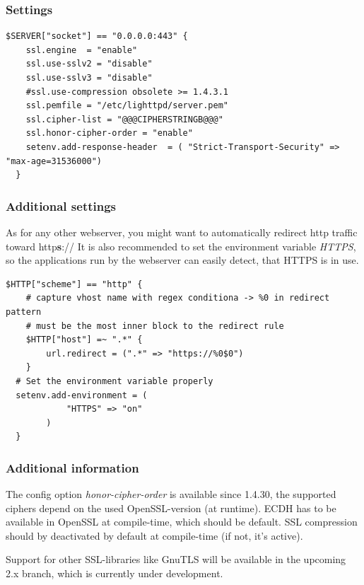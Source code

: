 \subsubsection{Settings}



\begin{lstlisting}[breaklines]
  $SERVER["socket"] == "0.0.0.0:443" {
    ssl.engine  = "enable"
    ssl.use-sslv2 = "disable"
    ssl.use-sslv3 = "disable"
    #ssl.use-compression obsolete >= 1.4.3.1
    ssl.pemfile = "/etc/lighttpd/server.pem"
    ssl.cipher-list = "@@@CIPHERSTRINGB@@@"
    ssl.honor-cipher-order = "enable"
    setenv.add-response-header  = ( "Strict-Transport-Security" => "max-age=31536000")
  }
\end{lstlisting}


\subsubsection{Additional settings}

As for any other webserver, you might want to automatically redirect http
traffic toward http\textbf{s}:// It is also recommended to set the environment variable
\emph{HTTPS}, so the applications run by the webserver can easily detect, that
HTTPS is in use.



\begin{lstlisting}[breaklines]
  $HTTP["scheme"] == "http" {
    # capture vhost name with regex conditiona -> %0 in redirect pattern
    # must be the most inner block to the redirect rule
    $HTTP["host"] =~ ".*" {
        url.redirect = (".*" => "https://%0$0")
    }
  # Set the environment variable properly
  setenv.add-environment = (
            "HTTPS" => "on"
        )
  }
\end{lstlisting}


\subsubsection{Additional information} 
The config option \emph{honor-cipher-order} is available since 1.4.30, the
supported ciphers depend on the used OpenSSL-version (at runtime). ECDH has to
be available in OpenSSL at compile-time, which should be default. SSL
compression should by deactivated by default at compile-time (if not, it's
active).

Support for other SSL-libraries like GnuTLS will be available in the upcoming
2.x branch, which is currently under development.


